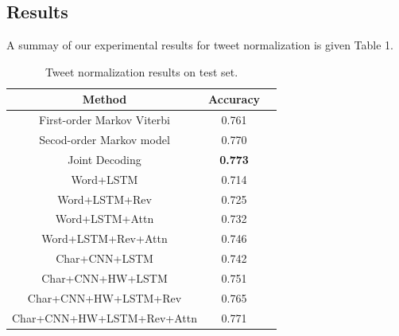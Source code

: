 \documentclass[letterpaper]{article}
\begin{document}
\subsection{Results}
A summay of our experimental results for tweet normalization is given Table 1. 
\begin{table}
	\begin{center}
		\begin{tabular}{| c | c | c | }
			\hline
			\bf Method & \bf Accuracy \\ \hline
			First-order Markov Viterbi & 0.761 \\ \hline
			Secod-order Markov model & 0.770 \\ \hline
			Joint Decoding & \textbf{0.773} \\ \hline
			Word+LSTM & 0.714 \\ \hline
			Word+LSTM+Rev & 0.725   \\ 
			\hline
			Word+LSTM+Attn & 0.732   \\ 
			\hline
			Word+LSTM+Rev+Attn & 0.746   \\ 
			\hline
			Char+CNN+LSTM & 0.742   \\ 
			\hline
			Char+CNN+HW+LSTM & 0.751   \\ 
			\hline
			Char+CNN+HW+LSTM+Rev & 0.765   \\ 
			\hline
			Char+CNN+HW+LSTM+Rev+Attn & 0.771 \\ 
			\hline
		\end{tabular}
		\caption{Tweet normalization results on test set.}
	\end{center}
\end{table}
\end{document}
